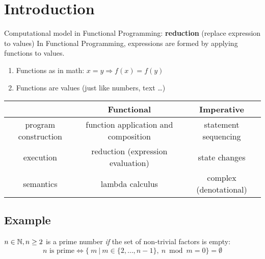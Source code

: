 


\section{Introduction} %
\label{cha:introduction}

Computational model in Functional Programming: \textbf{reduction} (replace expression to values)
In Functional Programming, expressions are formed by applying functions to values.
\begin{enumerate}
    \item Functions as in math: $x = y \Rightarrow f(x) = f(y)$
    \item Functions are values (just like numbers, text \dots)
\end{enumerate}

\begin{center}\begin{tabular}{|c|c|c|}\hline
\rowcolor{grau}                         & Functional                                & Imperative                \\\hline
                program construction    & function application and composition      & statement sequencing      \\\hline
                execution               & reduction (expression evaluation)         & state changes             \\\hline
                semantics               & lambda calculus                           & complex (denotational)    \\\hline
\end{tabular}\end{center}

\subsection*{Example}
$n \in \mathbb{N}, n \ge 2 $ is a prime number \textit{if} the set of non-trivial factors is empty:\\
$$ n \text{ is prime} \Leftrightarrow \{\ m\ |\ m \in \{2,\dots, n-1\},\ n \bmod m = 0 \} = \emptyset $$
\\

